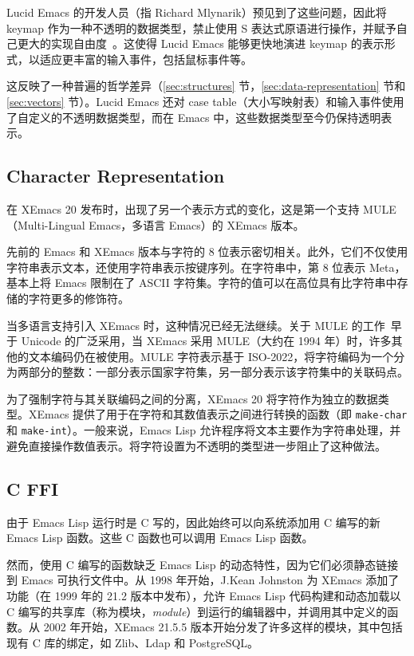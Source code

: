\documentclass[format=acmsmall,screen]{acmart}
\begin{document}
Lucid Emacs 的开发人员（指 Richard Mlynarik）预见到了这些问题，因此将 keymap 作为一种不透明的数据类型，禁止使用 S 表达式原语进行操作，并赋予自己更大的实现自由度~\cite{Mlynarik-personal}。这使得 Lucid Emacs 能够更快地演进 keymap 的表示形式，以适应更丰富的输入事件，包括鼠标事件等。

这反映了一种普遍的哲学差异（\ref{sec:structures} 节，\ref{sec:data-representation} 节和 \ref{sec:vectors} 节）。Lucid Emacs 还对 case table（大小写映射表）和输入事件使用了自定义的不透明数据类型，而在 Emacs 中，这些数据类型至今仍保持透明表示。

\subsection{Character Representation}
\label{sec:character-representation}

在 XEmacs 20 发布时，出现了另一个表示方式的变化，这是第一个支持 MULE（Multi-Lingual Emacs，多语言 Emacs）的 XEmacs 版本。

先前的 Emacs 和 XEmacs 版本与字符的 8 位表示密切相关。此外，它们不仅使用字符串表示文本，还使用字符串表示按键序列。在字符串中，第 8 位表示 Meta，基本上将 Emacs 限制在了 ASCII 字符集。字符的值可以在高位具有比字符串中存储的字符更多的修饰符。

当多语言支持引入 XEmacs 时，这种情况已经无法继续。关于 MULE 的工作~\cite{Ohmaki2002}早于 Unicode 的广泛采用，当 XEmacs 采用 MULE（大约在 1994 年）时，许多其他的文本编码仍在被使用。MULE 字符表示基于 ISO-2022，将字符编码为一个分为两部分的整数：一部分表示国家字符集，另一部分表示该字符集中的关联码点。

为了强制字符与其关联编码之间的分离，XEmacs 20 将字符作为独立的数据类型。XEmacs 提供了用于在字符和其数值表示之间进行转换的函数（即 \texttt{make-char} 和 \texttt{make-int}）。一般来说，Emacs Lisp 允许程序将文本主要作为字符串处理，并避免直接操作数值表示。将字符设置为不透明的类型进一步阻止了这种做法。

\subsection{C FFI}

由于 Emacs Lisp 运行时是 C 写的，因此始终可以向系统添加用 C 编写的新 Emacs Lisp 函数。这些 C 函数也可以调用 Emacs Lisp 函数。

然而，使用 C 编写的函数缺乏 Emacs Lisp 的动态特性，因为它们必须静态链接到 Emacs 可执行文件中。从 1998 年开始，J.Kean Johnston 为 XEmacs 添加了功能（在 1999 年的 21.2 版本中发布），允许 Emacs Lisp 代码构建和动态加载以 C 编写的共享库（称为模块，\textit{module}）到运行的编辑器中，并调用其中定义的函数。从 2002 年开始，XEmacs 21.5.5 版本开始分发了许多这样的模块，其中包括现有 C 库的绑定，如 Zlib、Ldap 和 PostgreSQL。
\end{document}
